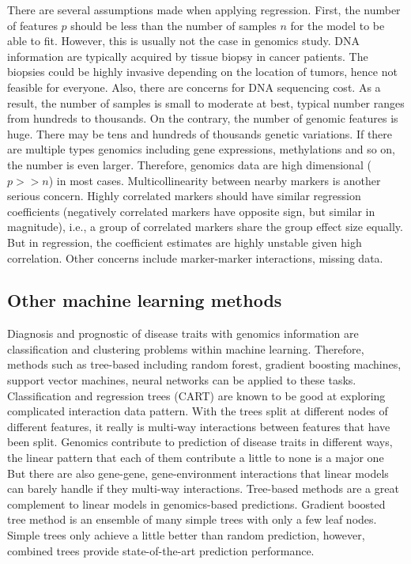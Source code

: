 There are several assumptions made when applying regression. First, the number of features $p$ should be less than the number of samples $n$ for the model to be able to fit. However, this is usually not the case in genomics study. DNA information are typically acquired by tissue biopsy in cancer patients. The biopsies could be highly invasive depending on the location of tumors, hence not feasible for everyone. Also, there are concerns for DNA sequencing cost. As a result, the number of samples is small to moderate at best, typical number ranges from hundreds to thousands. On the contrary, the number of genomic features is huge. There may be tens and hundreds of thousands genetic variations. If there are multiple types genomics including gene expressions, methylations and so on, the number is even larger. Therefore, genomics data are high dimensional ($p>>n$) in most cases. Multicollinearity between nearby markers is another serious concern. Highly correlated markers should have similar regression coefficients (negatively correlated markers have opposite sign, but similar in magnitude), i.e., a group of correlated markers share the group effect size equally. But in regression, the coefficient estimates are highly unstable given high correlation. Other concerns include marker-marker interactions, missing data. 

\subsection{Other machine learning methods}
\label{sec:tree}
Diagnosis and prognostic of disease traits with genomics information are classification and clustering problems within machine learning. Therefore, methods such as tree-based including random forest, gradient boosting machines, support vector machines, neural networks can be applied to these tasks. Classification and regression trees (CART) are known to be good at exploring complicated interaction data pattern. With the trees split at different nodes of different features, it really is multi-way interactions between features that have been split. Genomics contribute to prediction of disease traits in different ways, the linear pattern that each of them contribute a little to none is a major one But there are also gene-gene, gene-environment interactions that linear models can barely handle if they multi-way interactions. Tree-based methods are a great complement to linear models in genomics-based predictions. Gradient boosted tree method is an ensemble of many simple trees with only a few leaf nodes. Simple trees only achieve a little better than random prediction, however, combined trees provide state-of-the-art prediction performance. 

